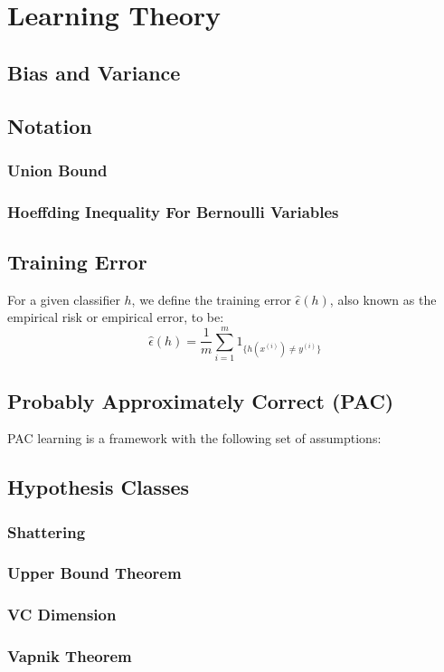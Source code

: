 \section{Learning Theory}
\subsection{Bias and Variance}
\subsection{Notation}
\subsubsection{Union Bound}
\subsubsection{Hoeffding Inequality For Bernoulli Variables}
\subsection{Training Error}
For a given classifier $h$, we define the training error $\widehat{\epsilon}(h)$,
also known as the empirical risk or empirical error, to be:
\begin{equation} \widehat{\epsilon}(h) = \frac{1}{m}\sum_{i=1}^m 1_{\{h(x^{(i)})\neq y^{(i)}\}} \end{equation}
\subsection{Probably Approximately Correct (PAC)}
PAC learning is a framework with the following set of assumptions:
\subsection{Hypothesis Classes}
\subsubsection{Shattering}
\subsubsection{Upper Bound Theorem}
\subsubsection{VC Dimension}
\subsubsection{Vapnik Theorem}

